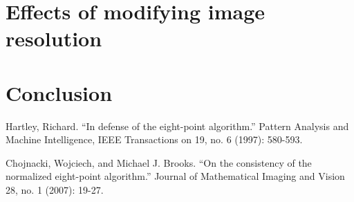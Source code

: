 \documentclass{article}
\begin{document}






\newpage
\section{Effects of modifying image resolution}

\newpage
\section{Conclusion}

\newpage


\newpage
\begin{thebibliography}{99}
	Hartley, Richard. ``In defense of the eight-point algorithm.'' Pattern Analysis and Machine Intelligence, IEEE Transactions on 19, no. 6 (1997): 580-593.

	Chojnacki, Wojciech, and Michael J. Brooks. ``On the consistency of the normalized eight-point algorithm.'' Journal of Mathematical Imaging and Vision 28, no. 1 (2007): 19-27.
\end{thebibliography}
\end{document}
